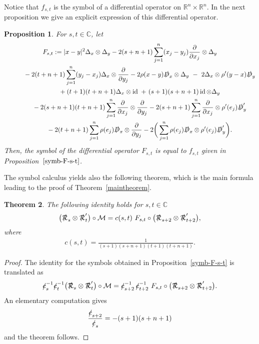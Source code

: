 \documentclass[10pt,a4paper]{amsart}
\DeclareMathOperator{\id}{id}
\newcommand{\fsl}[1]{{\slashed{#1}}} %
\numberwithin{equation}{section}
\newtheorem{theor}{Theorem}[section]
\newtheorem{prop}[theor]{Proposition}
\begin{document}
Notice that $f_{s,t}$ is the symbol of a differential operator on $\mathbb R^n\times \mathbb R^n$. In the next proposition we give an explicit expression of this differential operator.
\begin{prop}
 For $s,t\in \mathbb C$, let
\begin{gather*}
 F_{s,t} := \vert x-y\vert^2 \Delta_x\otimes \Delta_y
- 2(s+n+1) \sum_{j=1}^n (x_j-y_j) \frac{\partial}{\partial x_j} \otimes \Delta_y
\\ \hphantom{ F_{s,t} :=}
{}-2(t+n+1) \sum_{j=1}^n (y_j-x_j) \Delta_x\otimes \frac{\partial}{\partial y_j}
-2\rho(x-y)\fsl{D}_x\otimes \Delta_y\ -\ 2 \Delta_x\otimes \rho'(y-x) \fsl{D}_y
\\ \hphantom{ F_{s,t} :=}
{}+(t+1)(t+n+1) \Delta_x\otimes \id\ +\ (s+1)(s+n+1)\id\otimes\Delta_y
\\ \hphantom{ F_{s,t} :=}
{}-2(s+n+1)(t+n+1) \sum_{j=1}^n \frac{\partial}{\partial x_j} \otimes \frac{\partial}{\partial y_j}
-2(s+n+1) \sum_{j=1}^n \frac{\partial}{\partial x_j}\otimes \rho'(e_j)\fsl{D}'_y
\\ \hphantom{ F_{s,t} :=}
{}-2(t+n+1) \sum_{j=1}^n \rho(e_j)\fsl{D}_x\otimes \frac{\partial}{\partial y_j}
- 2\bigg(\sum_{j=1}^n \rho(e_j) \fsl{D}_x\otimes \rho'(e_j)\fsl{D}'_y\bigg).
\end{gather*}
Then, the symbol of the differential operator $F_{s,t}$ is equal to $f_{s,t}$ given in Proposition~$\ref{symb-F-s-t}$.
\end{prop}

The symbol calculus yields also the following theorem, which is the main formula leading to the proof of Theorem~\ref{maintheorem}.
\begin{theor} The following identity holds for $s,t\in \mathbb C$
\begin{gather}\label{estrr}
\big(\fsl{\mathcal R}_s\otimes \fsl{\mathcal R}'_t\big)\circ \mathcal M =c(s,t)\ F_{s,t}\circ \big(\fsl{\mathcal R}_{s+2} \otimes \fsl{\mathcal R}'_{t+2}\big),
\end{gather}
where
\begin{gather*}
c(s,t) = \frac{1}{(s+1)(s+n+1)(t+1)(t+n+1)}.
\end{gather*}
\end{theor}
\begin{proof} The identity for the symbols obtained in Proposition~\ref{symb-F-s-t} is translated as
\begin{gather*}
\fsl{c}_s^{-1} \fsl{c}_t^{-1}\big(\fsl{\mathcal R}_s\otimes \fsl{\mathcal R}_t'\big)\circ \mathcal M = \fsl{c}_{s+2}^{-1}\,\fsl{c}_{t+2}^{-1}\ F_{s,t}\circ\big(\fsl{\mathcal R}_{s+2}\otimes \fsl{\mathcal R}_{t+2}'\big).
\end{gather*}
An elementary computation gives
\begin{gather*}
\frac{\fsl{c}_{s+2}}{\fsl{c}_s} = -(s+1)(s+n+1)
\end{gather*}
and the theorem follows.
\end{proof}
\end{document}
